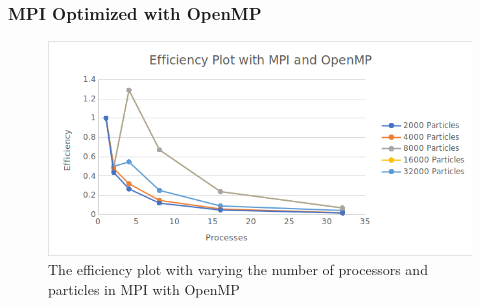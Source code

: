 \documentclass{article}
\begin{document}
\subsubsection{MPI Optimized with OpenMP}
\begin{figure}[H]
	\begin{center}
		\hspace*{-0.5cm}                                                           
  		\includegraphics[scale=0.6]{Report_Assets/efficiencyomp.png}
  	\end{center}
  	\caption{The efficiency plot with varying the number of processors and particles in MPI with OpenMP}
\end{figure}
\end{document}
